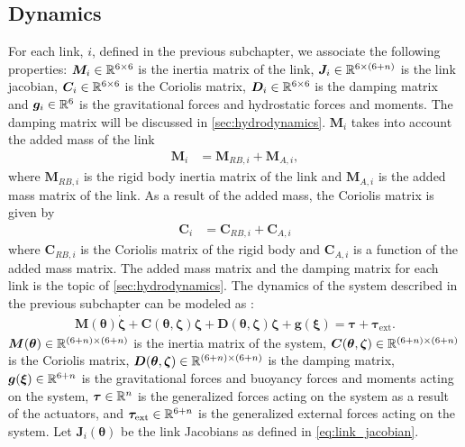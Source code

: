 \fi %


\subsection{Dynamics}

For each link, $i$, defined in the previous subchapter, we associate the following
properties: $\bm{M}_i \in \mathbb{R}^{6 \times 6}$ is the inertia matrix of the link,
$\bm{J}_i \in \mathbb{R}^{6 \times (6+n)}$ is the link jacobian, $\bm{C}_i \in \mathbb{R}^{6 \times 6}$
is the Coriolis matrix, $\bm{D}_i \in \mathbb{R}^{6 \times 6}$ is the damping matrix and
$\bm{g}_i \in \mathbb{R}^{6}$ is the gravitational forces and hydrostatic forces and moments.
The damping matrix will be discussed in \autoref{sec:hydrodynamics}.
$\bm{M}_i$ takes into account the added mass of the link
\begin{align}
    \bm{M}_i &= \bm{M}_{RB,i} + \bm{M}_{A,i},
\end{align}
where $\bm{M}_{RB,i}$ is the rigid body inertia matrix of the link and $\bm{M}_{A,i}$
is the added mass matrix of the link. As a result of the added mass, the Coriolis
matrix is given by
\begin{align}
    \bm{C}_i &= \bm{C}_{RB,i} + \bm{C}_{A,i}
\end{align}
where $\bm{C}_{RB,i}$ is the Coriolis matrix of the rigid body and $\bm{C}_{A,i}$
is a function of the added mass matrix. The added mass matrix and the damping matrix
for each link is the topic of \autoref{sec:hydrodynamics}. The dynamics of the
system described in the previous subchapter can be modeled as
\cite{from2014}:
\begin{align}
    \bm{M}(\bm{\theta})\dot{\bm{\zeta}} +
        \bm{C}(\bm{\theta}, \bm{\zeta}) \bm{\zeta} +
        \bm{D}(\bm{\theta}, \bm{\zeta}) \bm{\zeta} +
        \bm{g}(\bm{\xi}) =
        \bm{\tau} + \bm{\tau}_{\mathrm{ext}}.
\end{align}
$\bm{M}(\bm{\theta}) \in \mathbb{R}^{(6+n)\times(6+n)}$  is the inertia matrix of the
system, $\bm{C}(\bm{\theta}, \bm{\zeta}) \in \mathbb{R}^{(6+n)\times(6+n)}$ is the
Coriolis matrix, $\bm{D}(\bm{\theta}, \bm{\zeta}) \in \mathbb{R}^{(6+n)\times(6+n)}$ is
the damping matrix, $\bm{g}(\bm{\xi}) \in \mathbb{R}^{6+n}$ is the gravitational forces
and buoyancy forces and moments acting on the system, $\bm{\tau} \in \mathbb{R}^{n}$ is the generalized
forces acting on the system as a result of the actuators,
and $\bm{\tau}_{\mathrm{ext}} \in \mathbb{R}^{6+n}$ is the
generalized external forces acting on the system. Let $\bm{J}_{i}(\bm{\theta})$
be the link Jacobians as defined in \autoref{eq:link_jacobian}.
